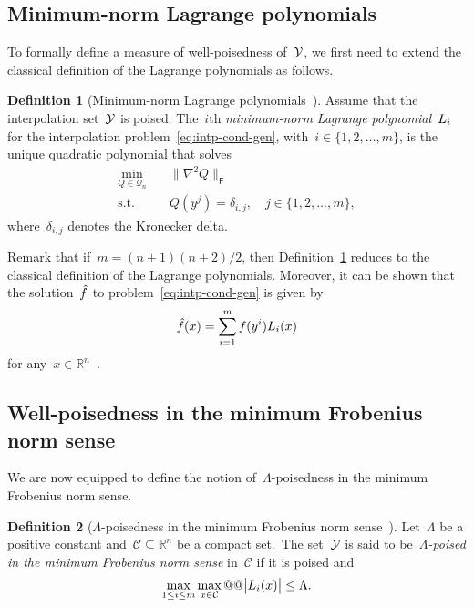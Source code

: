 \documentclass{article}
\numberwithin{equation}{section}
\theoremstyle{definition}
\newtheorem{definition}{Definition}[section]
\theoremstyle{plain}
\theoremstyle{remark}
\newcommand*{\abs}[2][]{#1\lvert#2#1\rvert}
\newcommand*{\lagp}[1][]{L\ifblank{#1}{}{_{#1}}}
\newcommand*{\norm}[2][]{#1\lVert#2#1\rVert}
\newcommand*{\obj}{f}
\newcommand*{\objm}[1][]{\hat{\obj}\ifblank{#1}{}{^{#1}}}
\newcommand*{\qpoly}{\mathcal{Q}_n}
\newcommand*{\R}{\mathbb{R}}
\newcommand*{\set}[2][]{#1\{#2#1\}}
\newcommand*{\xpt}[1][]{\mathcal{Y}\ifblank{#1}{}{^{#1}}}
\begin{document}
\subsection{Minimum-norm Lagrange polynomials}

To formally define a measure of well-poisedness of~$\xpt$, we first need to extend the classical definition of the Lagrange polynomials as follows.

\begin{definition}[Minimum-norm Lagrange polynomials~{\cite[Definition~5.1]{Conn_Scheinberg_Vicente_2009}}]
    \label{def:min-norm-lagp}
    Assume that the interpolation set~$\xpt$ is poised.
    The~$i$th \emph{minimum-norm Lagrange polynomial}~$\lagp[i]$ for the interpolation problem~\eqref{eq:intp-cond-gen}, with~$i \in \set{1, 2, \dots, m}$, is the unique quadratic polynomial that solves
    \begin{equation*}
        \begin{aligned}
            \min_{Q \in \qpoly} & \quad \norm[\big]{\nabla^2 Q}_{\mathsf{F}}\\
            \text{s.t.}         & \quad Q(y^j) = \delta_{i, j}, \quad j \in \set{1, 2, \dots, m},
        \end{aligned}
    \end{equation*}
    where~$\delta_{i, j}$ denotes the Kronecker delta.
\end{definition}

Remark that if~$m = (n + 1) (n + 2) / 2$, then Definition~\ref{def:min-norm-lagp} reduces to the classical definition of the Lagrange polynomials.
Moreover, it can be shown that the solution~$\objm$ to problem~\eqref{eq:intp-cond-gen} is given by
\begin{equation*}
    \objm(x) = \sum_{i = 1}^m \obj(y^i) \lagp[i](x)
\end{equation*}
for any~$x \in \R^n$~\cite[Lemma~5.2]{Conn_Scheinberg_Vicente_2009}.

\subsection{Well-poisedness in the minimum Frobenius norm sense}

We are now equipped to define the notion of~$\Lambda$-poisedness in the minimum Frobenius norm sense.

\begin{definition}[$\Lambda$-poisedness in the minimum Frobenius norm sense~{\cite[Definition~5.6]{Conn_Scheinberg_Vicente_2009}}]
    \label{def:lambda-p}
    Let~$\Lambda$ be a positive constant and~$\mathcal{C}\subseteq\R^n$ be a compact set.~The set~$\xpt$ is said to be~\emph{$\Lambda$-poised in the minimum Frobenius norm sense} in~$\mathcal{C}$ if it is poised and
    \begin{equation*}
        \max_{1 \le i \le m} \max_{x \in \mathcal{C}} @@ \abs[\big]{\lagp[i](x)} \le \Lambda.
    \end{equation*}
\end{definition}
\end{document}
